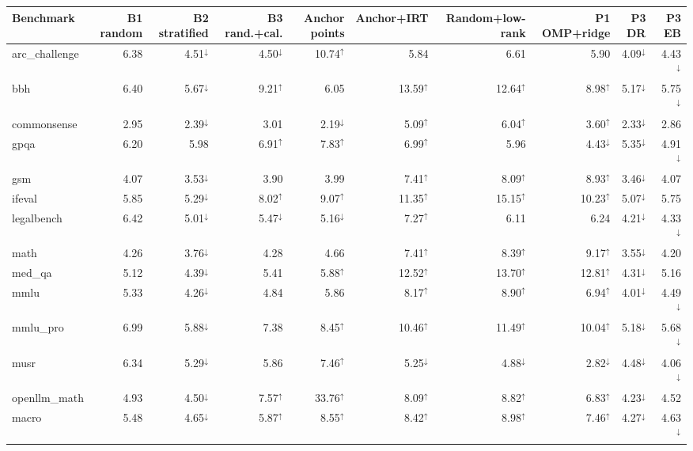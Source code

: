{\scriptsize\setlength{\tabcolsep}{2.5pt}
\begin{tabular}{lrrrrrrrrr}
\toprule
Benchmark & B1 random & B2 stratified & B3 rand.+cal. & Anchor points & Anchor+IRT & Random+low-rank & P1 OMP+ridge & P3 DR & P3 EB \\
\midrule
arc\_challenge & 6.38 & 4.51$^{\downarrow}$ & 4.50$^{\downarrow}$ & 10.74$^{\uparrow}$ & 5.84 & 6.61 & 5.90 & 4.09$^{\downarrow}$ & 4.43$^{\downarrow}$ \\
bbh & 6.40 & 5.67$^{\downarrow}$ & 9.21$^{\uparrow}$ & 6.05 & 13.59$^{\uparrow}$ & 12.64$^{\uparrow}$ & 8.98$^{\uparrow}$ & 5.17$^{\downarrow}$ & 5.75$^{\downarrow}$ \\
commonsense & 2.95 & 2.39$^{\downarrow}$ & 3.01 & 2.19$^{\downarrow}$ & 5.09$^{\uparrow}$ & 6.04$^{\uparrow}$ & 3.60$^{\uparrow}$ & 2.33$^{\downarrow}$ & 2.86 \\
gpqa & 6.20 & 5.98 & 6.91$^{\uparrow}$ & 7.83$^{\uparrow}$ & 6.99$^{\uparrow}$ & 5.96 & 4.43$^{\downarrow}$ & 5.35$^{\downarrow}$ & 4.91$^{\downarrow}$ \\
gsm & 4.07 & 3.53$^{\downarrow}$ & 3.90 & 3.99 & 7.41$^{\uparrow}$ & 8.09$^{\uparrow}$ & 8.93$^{\uparrow}$ & 3.46$^{\downarrow}$ & 4.07 \\
ifeval & 5.85 & 5.29$^{\downarrow}$ & 8.02$^{\uparrow}$ & 9.07$^{\uparrow}$ & 11.35$^{\uparrow}$ & 15.15$^{\uparrow}$ & 10.23$^{\uparrow}$ & 5.07$^{\downarrow}$ & 5.75 \\
legalbench & 6.42 & 5.01$^{\downarrow}$ & 5.47$^{\downarrow}$ & 5.16$^{\downarrow}$ & 7.27$^{\uparrow}$ & 6.11 & 6.24 & 4.21$^{\downarrow}$ & 4.33$^{\downarrow}$ \\
math & 4.26 & 3.76$^{\downarrow}$ & 4.28 & 4.66 & 7.41$^{\uparrow}$ & 8.39$^{\uparrow}$ & 9.17$^{\uparrow}$ & 3.55$^{\downarrow}$ & 4.20 \\
med\_qa & 5.12 & 4.39$^{\downarrow}$ & 5.41 & 5.88$^{\uparrow}$ & 12.52$^{\uparrow}$ & 13.70$^{\uparrow}$ & 12.81$^{\uparrow}$ & 4.31$^{\downarrow}$ & 5.16 \\
mmlu & 5.33 & 4.26$^{\downarrow}$ & 4.84 & 5.86 & 8.17$^{\uparrow}$ & 8.90$^{\uparrow}$ & 6.94$^{\uparrow}$ & 4.01$^{\downarrow}$ & 4.49$^{\downarrow}$ \\
mmlu\_pro & 6.99 & 5.88$^{\downarrow}$ & 7.38 & 8.45$^{\uparrow}$ & 10.46$^{\uparrow}$ & 11.49$^{\uparrow}$ & 10.04$^{\uparrow}$ & 5.18$^{\downarrow}$ & 5.68$^{\downarrow}$ \\
musr & 6.34 & 5.29$^{\downarrow}$ & 5.86 & 7.46$^{\uparrow}$ & 5.25$^{\downarrow}$ & 4.88$^{\downarrow}$ & 2.82$^{\downarrow}$ & 4.48$^{\downarrow}$ & 4.06$^{\downarrow}$ \\
openllm\_math & 4.93 & 4.50$^{\downarrow}$ & 7.57$^{\uparrow}$ & 33.76$^{\uparrow}$ & 8.09$^{\uparrow}$ & 8.82$^{\uparrow}$ & 6.83$^{\uparrow}$ & 4.23$^{\downarrow}$ & 4.52 \\
\midrule
macro & 5.48 & 4.65$^{\downarrow}$ & 5.87$^{\uparrow}$ & 8.55$^{\uparrow}$ & 8.42$^{\uparrow}$ & 8.98$^{\uparrow}$ & 7.46$^{\uparrow}$ & 4.27$^{\downarrow}$ & 4.63$^{\downarrow}$ \\
\bottomrule
\end{tabular}}
